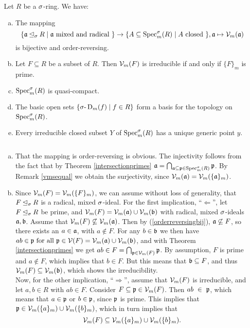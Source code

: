 \begin{prop}
Let $R$ be a $\sigma$-ring. We have:
\begin{enumerate}[(a)]
\item \label{vmbijection} The mapping 
$$\{ \mathfrak{a} \unlhd_{\sigma} R \mid \mathfrak{a}\text{ mixed and radical }\} \rightarrow \{ A \subseteq \operatorname{Spec}^\sigma_m(R) \mid A \text{ closed }\}, \mathfrak{a} \mapsto \mathcal{V}_m(\mathfrak{a})$$
 is bijective and order-reversing.
\item \label{irred=prime} Let $F \subseteq R$ be a subset of $R$. Then $\mathcal{V}_m(F)$ is irreducible if and only if $\{F\}_m$ is prime.
\item $\operatorname{Spec}^\sigma_m(R)$ is quasi-compact.
\item The basic open sets $\{ \sigma\text{-}\operatorname{D}_m(f) \mid f \in R \}$ form a basis for the topology on $\operatorname{Spec}^\sigma_m(R)$.
\item Every irreducible closed subset $Y$ of $\operatorname{Spec}^\sigma_m(R)$ has a unique generic point $y$.
\end{enumerate}
\clearpage %
\begin{bew} $~$
\begin{enumerate}[(a)]
\item \label{orderreversingbij} That the mapping is order-reversing is obvious. The injectivity follows from the fact that by Theorem \ref{intersectionprimes} $\mathfrak{a} = \bigcap_{\mathfrak{a} \subseteq \mathfrak{p} \in \operatorname{Spec}^\sigma_m(R)} \mathfrak{p}$. By Remark \ref{vmsequal} we obtain the surjectivity,
 since $\mathcal{V}_m(\mathfrak{a}) = \mathcal{V}_m(\{\mathfrak{a}\}_m)$.
\item Since $\mathcal{V}_m(F) = \mathcal{V}_m(\{F\}_m)$, we can assume without loss of generality, that $F \unlhd_{\sigma} R$ is a radical, mixed $\sigma$-ideal.
For the first implication, ``$\Leftarrow$'', let $F \unlhd_{\sigma} R$ be prime, and $\mathcal{V}_m(F) = \mathcal{V}_m(\mathfrak{a}) \cup \mathcal{V}_m(\mathfrak{b})$ with radical, mixed $\sigma$-ideals $\mathfrak{a}, \mathfrak{b}$. Assume that $\mathcal{V}_m(F) \not\subseteq \mathcal{V}_m(\mathfrak{a})$. Then by (\ref{orderreversingbij}), $\mathfrak{a} \not \subseteq F$, so there exists an $a \in \mathfrak{a}$, with $a \notin F$.
For any $b \in \mathfrak{b}$ we then have $ab \in \mathfrak{p} \text{ for all } \mathfrak{p} \in \mathcal{V}(F) = \mathcal{V}_m(\mathfrak{a}) \cup \mathcal{V}_m(\mathfrak{b})$, and with Theorem \ref{intersectionprimes} we get $ab \in F = \bigcap_{\mathfrak{p} \in \mathcal{V}_m(F)}\mathfrak{p}$. By assumption, $F$ is prime and $a \notin F$, which implies
 that  $b \in F$. But this means that $\mathfrak{b} \subseteq F$, and thus $\mathcal{V}_m(F) \subseteq \mathcal{V}_m(\mathfrak{b})$, which shows the irreducibility. \\
\indent Now, for the other implication, ``$\Rightarrow$'', assume that $\mathcal{V}_m(F)$ is irreducible, and let $a,b \in R$ with $ab \in F$. Consider $F \subseteq \mathfrak{p} \in \mathcal{V}_m(F)$. Then $ab~\in~\mathfrak{p}$, 
which means that $a \in \mathfrak{p}$ or $b \in \mathfrak{p}$, since $\mathfrak{p}$ is prime. This implies that $\mathfrak{p} \in \mathcal{V}_m(\{a\}_m) \cup \mathcal{V}_m(\{b\}_m)$, which in turn implies that $$\mathcal{V}_m(F) \subseteq \mathcal{V}_m(\{a\}_{m}) \cup \mathcal{V}_m(\{b\}_{m}).$$

\end{enumerate}
\end{bew}
\end{prop}
